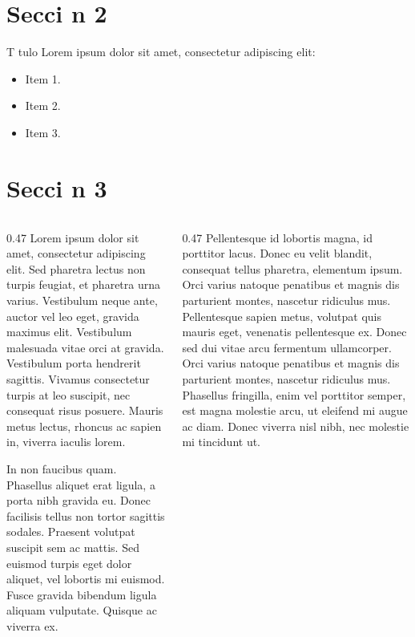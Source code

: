 \documentclass{article}
\begin{document}
	\section{Secci n 2}
	
	\begin{frame}{T tulo}
		\justifying
		\hspace*{20pt} Lorem ipsum dolor sit amet, consectetur adipiscing elit:
		\begin{itemize}
			\item Item 1.
			\item Item 2.
			\item Item 3.
		\end{itemize}
	\end{frame}
	
	\section{Secci n 3}
	
	\begin{frame}
		\begin{columns}
			\begin{column}{0.47\textwidth}\setlength\parskip{0.4\baselineskip}
				\justifying
				\hspace*{20pt} Lorem ipsum dolor sit amet, consectetur adipiscing elit. Sed pharetra lectus non turpis feugiat, et pharetra urna varius. Vestibulum neque ante, auctor vel leo eget, gravida maximus elit. Vestibulum malesuada vitae orci at gravida. Vestibulum porta hendrerit sagittis. Vivamus consectetur turpis at leo suscipit, nec consequat risus posuere. Mauris metus lectus, rhoncus ac sapien in, viverra iaculis lorem.
				
				\hspace*{20pt} In non faucibus quam. Phasellus aliquet erat ligula, a porta nibh gravida eu. Donec facilisis tellus non tortor sagittis sodales. Praesent volutpat suscipit sem ac mattis. Sed euismod turpis eget dolor aliquet, vel lobortis mi euismod. Fusce gravida bibendum ligula aliquam vulputate. Quisque ac viverra ex.
			\end{column}
			\begin{column}{0.47\textwidth}\setlength\parskip{0.4\baselineskip}
				\justifying
				\hspace*{20pt} Pellentesque id lobortis magna, id porttitor lacus. Donec eu velit blandit, consequat tellus pharetra, elementum ipsum. Orci varius natoque penatibus et magnis dis parturient montes, nascetur ridiculus mus. Pellentesque sapien metus, volutpat quis mauris eget, venenatis pellentesque ex. Donec sed dui vitae arcu fermentum ullamcorper. Orci varius natoque penatibus et magnis dis parturient montes, nascetur ridiculus mus. Phasellus fringilla, enim vel porttitor semper, est magna molestie arcu, ut eleifend mi augue ac diam. Donec viverra nisl nibh, nec molestie mi tincidunt ut.
			\end{column}
		\end{columns}
	\end{frame}
	
\end{document}
